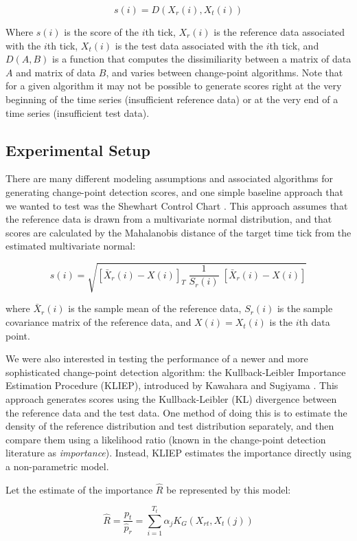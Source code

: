 \[
s(i) = D(X_r(i), X_t(i))
\]

Where $s(i)$ is the score of the $i$th tick, $X_r(i)$ is the reference
data associated with the $i$th tick, $X_t(i)$ is the test data
associated with the $i$th tick, and $D(A,B)$ is a function that computes the
dissimiliarity between a matrix of data $A$ and matrix of data $B$, and varies
between change-point algorithms. Note that for a given
algorithm it may not be possible to generate scores right at the very beginning
of the time series (insufficient reference data) or at the very end of a time
series (insufficient test data).

\subsection{Experimental Setup}

There are many different modeling assumptions and associated algorithms
for generating change-point detection scores, and one simple baseline approach that we 
wanted to test was the Shewhart Control Chart \cite{shewhart26}.
This approach assumes that the reference data is drawn from a
multivariate normal distribution, and that scores are calculated by the Mahalanobis
distance of the target time tick from the estimated multivariate normal:

\[
s(i) = \sqrt{[\bar{X}_r(i) - X(i)]_T \; \frac{1}{S_r(i)} \; [\bar{X}_r(i) - X(i)]}
\]

where $\bar{X}_r(i)$ is the sample mean of the reference data, $S_r(i)$
is the sample covariance matrix of the reference data, and $X(i)=X_t(i)$ is
the $i$th data point.

We were also interested in testing the performance of a newer and more
sophisticated change-point detection algorithm: the
Kullback-Leibler Importance Estimation Procedure (KLIEP),
introduced by Kawahara and Sugiyama \cite{sugiyama09} \cite{sugiyama08}.
This approach generates scores using the Kullback-Leibler (KL)
divergence between the reference data and the test data. One method of doing this
is to estimate the density of the reference distribution and test distribution
separately, and then compare them using a likelihood ratio
(known in the change-point detection literature as \emph{importance}). 
Instead, KLIEP estimates the importance directly using a non-parametric model.

Let the estimate of the importance $\hat{R}$ be represented by this model:

\[
\hat{R} = \frac{p_t}{\hat{p}_r} = \sum_{i=1}^{T_t} \alpha_j K_G(X_{rt},X_t(j))
\]

